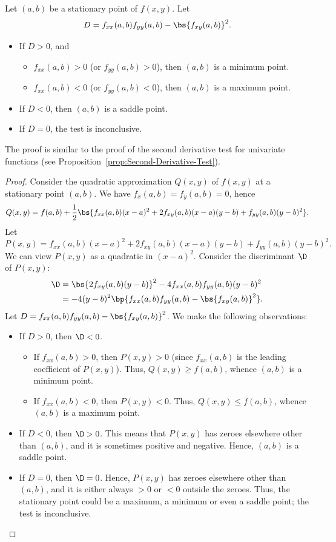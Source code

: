 \begin{proposition}
    Let $(a, b)$ be a stationary point of $f(x, y)$. Let \[D = f_{xx}(a, b) f_{yy}(a,b) - \bs{f_{xy}(a, b)}^2.\]
    \begin{itemize}
        \item If $D > 0$, and
        \begin{itemize}
            \item $f_{xx}(a, b) > 0$ (or $f_{yy} (a, b) > 0$), then $(a, b)$ is a minimum point.
            \item $f_{xx}(a, b) < 0$ (or $f_{yy} (a, b) < 0$), then $(a, b)$ is a maximum point.
        \end{itemize}
        \item If $D < 0$, then $(a, b)$ is a saddle point.
        \item If $D = 0$, the test is inconclusive.
    \end{itemize}
\end{proposition}
The proof is similar to the proof of the second derivative test for univariate functions (see Proposition~\ref{prop:Second-Derivative-Test}).
\begin{proof}
    Consider the quadratic approximation $Q(x, y)$ of $f(x, y)$ at a stationary point $(a, b)$. We have $f_x(a, b) = f_y(a, b) = 0$, hence \[Q(x, y) = f(a, b) + \frac12 \bs{f_{xx} (a, b) (x-a)^2 + 2 f_{xy}(a, b) (x-a)(y-b) + f_{yy}(a, b) (y-b)^2}.\] Let \[P(x, y) = f_{xx} (a, b) (x-a)^2 + 2 f_{xy}(a, b) (x-a)(y-b) + f_{yy}(a, b) (y-b)^2.\] We can view $P(x, y)$ as a quadratic in $(x-a)^2$. Consider the discriminant $\D$ of $P(x, y)$:
    \begin{align*}
        \D &= \bs{2 f_{xy}(a, b) (y-b)}^2 - 4 f_{xx} (a, b) f_{yy}(a, b) (y-b)^2\\
        &= -4(y-b)^2 \bp{f_{xx}(a, b)f_{yy}(a, b) - \bs{f_{xy}(a, b)}^2}.
    \end{align*}
    Let $D = f_{xx}(a, b)f_{yy}(a, b) - \bs{f_{xy}(a, b)}^2$. We make the following observations:
    \begin{itemize}
        \item If $D > 0$, then $\D < 0$.
        \begin{itemize}
            \item If $f_{xx}(a, b) > 0$, then $P(x, y) > 0$ (since $f_{xx}(a, b)$ is the leading coefficient of $P(x, y)$). Thus, $Q(x, y) \geq f(a, b)$, whence $(a, b)$ is a minimum point.
            \item If $f_{xx}(a, b) < 0$, then $P(x, y) < 0$. Thus, $Q(x, y) \leq f(a, b)$, whence $(a, b)$ is a maximum point.
        \end{itemize}
        \item If $D < 0$, then $\D > 0$. This means that $P(x, y)$ has zeroes elsewhere other than $(a, b)$, and it is sometimes positive and negative. Hence, $(a, b)$ is a saddle point.
        \item If $D = 0$, then $\D = 0$. Hence, $P(x, y)$ has zeroes elsewhere other than $(a, b)$, and it is either always $> 0$ or $< 0$ outside the zeroes. Thus, the stationary point could be a maximum, a minimum or even a saddle point; the test is inconclusive.
    \end{itemize}
\end{proof}